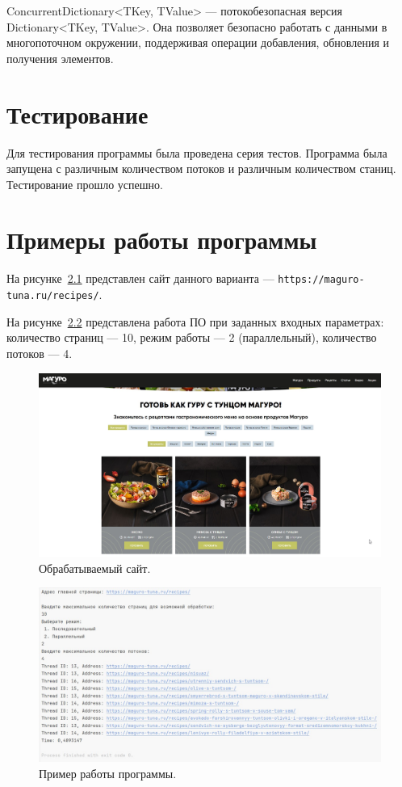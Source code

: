 ConcurrentDictionary<TKey, TValue> — потокобезопасная версия Dictionary<TKey, TValue>. Она позволяет безопасно работать с данными в многопоточном окружении, поддерживая операции добавления, обновления и получения элементов.~\cite{lit2}

\vspace{20mm}
\chapter{Тестирование}

Для тестирования программы была проведена серия тестов. Программа была запущена с различным количеством потоков и различным количеством станиц. Тестирование прошло успешно.

\vspace{20mm}
\chapter{Примеры работы программы}
На рисунке~\ref{images:cite} представлен сайт данного варианта --- \texttt{https://maguro-tuna.ru/recipes/}.


На рисунке~\ref{images:working_prog} представлена работа ПО при заданных входных параметрах: количество страниц --- 10, режим работы --- 2 (параллельный), количество потоков --- 4.

\begin{figure}[H]
    \centering
    \includegraphics[width=170mm]{images/cite}
    \caption{Обрабатываемый сайт.}
    \label{images:cite}
\end{figure}

\begin{figure}[H]
    \centering
    \includegraphics[width=170mm]{images/working_prog}
    \caption{Пример работы программы.}
    \label{images:working_prog}
\end{figure}


